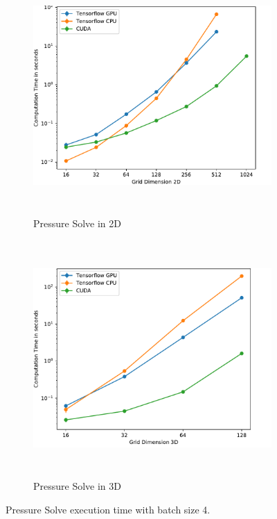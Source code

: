 \begin{figure}[t]
\centering
	\begin{subfigure}[b]{1\textwidth}
		\centering
		\includegraphics[height=9cm, width=14cm]{figures/2d_bs4}

		\caption{Pressure Solve in 2D}
	\end{subfigure}
	\begin{subfigure}[b]{1\textwidth}
		\centering
		\includegraphics[height=9cm, width=14cm]{figures/3d_bs4}

		\caption{Pressure Solve in 3D}
	\end{subfigure}

\caption{Pressure Solve execution time with batch size 4.}	\label{fig:perfbs4}
\end{figure}
